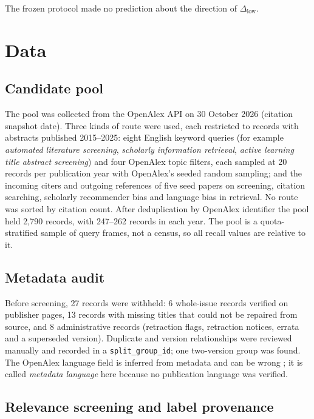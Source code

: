 \documentclass[acmsmall,screen,nonacm]{acmart}
\begin{document}
The frozen protocol made no prediction about the direction of $\Delta_{\text{low}}$.

\section{Data}
\label{sec:data}

\subsection{Candidate pool}

The pool was collected from the OpenAlex API \cite{priem2022openalex} on 30 October 2026 (citation
snapshot date). Three kinds of route were used, each restricted to records with abstracts published
2015--2025: eight English keyword queries (for example \emph{automated literature screening},
\emph{scholarly information retrieval}, \emph{active learning title abstract screening}) and four OpenAlex
topic filters, each sampled at 20 records per publication year with OpenAlex's seeded random sampling;
and the incoming citers and outgoing references of five seed papers on screening, citation searching,
scholarly recommender bias and language bias in retrieval. No route was sorted by citation count. After
deduplication by OpenAlex identifier the pool held 2,790 records, with 247--262 records in each year.
The pool is a quota-stratified sample of query frames, not a census, so all recall values are relative to
it.

\subsection{Metadata audit}

Before screening, 27 records were withheld: 6 whole-issue records verified on publisher pages, 13
records with missing titles that could not be repaired from source, and 8 administrative records
(retraction flags, retraction notices, errata and a superseded version). Duplicate and version
relationships were reviewed manually and recorded in a \texttt{split\_group\_id}; one two-version group
was found. The OpenAlex language field is inferred from metadata and can be wrong
\cite{cespedes2025openalex}; it is called \emph{metadata language} here because no publication language
was verified.

\subsection{Relevance screening and label provenance}
\end{document}
